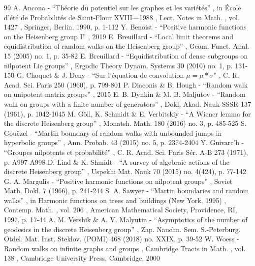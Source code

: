 \documentclass[11pt]{article}
\providecommand{\backmatter}{}
\numberwithin{equation}{section}
\theoremstyle{definition}
\begin{document}
\backmatter


\begin{thebibliography}{99}
 A. Ancona - “Théorie du potentiel sur les graphes et les variétés” , in École d’été de Probabilités de Saint-Flour XVIII—1988 , Lect. Notes in Math. , vol. 1427 , Springer, Berlin, 1990, p. 1-112
 Y. Benoist - “Positive harmonic functions on the Heisenberg group I” , 2019
 E. Breuillard - “Local limit theorems and equidistribution of random walks on the Heisenberg group” , Geom. Funct. Anal. 15 (2005) no. 1, p. 35-82
 E. Breuillard - “Equidistribution of dense subgroups on nilpotent Lie groups” , Ergodic Theory Dynam. Systems 30 (2010) no. 1, p. 131-150
 G. Choquet \& J. Deny - “Sur l’équation de convolution $\mu =\mu \ast \sigma $” , C. R. Acad. Sci. Paris 250 (1960), p. 799-801
 P. Diaconis \& B. Hough - “Random walk on unipotent matrix groups” , 2015
 E. B. Dynkin \& M. B. Maljutov - “Random walk on groups with a finite number of generators” , Dokl. Akad. Nauk SSSR 137 (1961), p. 1042-1045
 M. Göll, K. Schmidt \& E. Verbitskiy - “A Wiener lemma for the discrete Heisenberg group” , Monatsh. Math. 180 (2016) no. 3, p. 485-525
 S. Gouëzel - “Martin boundary of random walks with unbounded jumps in hyperbolic groups” , Ann. Probab. 43 (2015) no. 5, p. 2374-2404
 Y. Guivarc’h - “Groupes nilpotents et probabilité” , C. R. Acad. Sci. Paris Sér. A-B 273 (1971), p. A997-A998
 D. Lind \& K. Shmidt - “A survey of algebraic actions of the discrete Heisenberg group” , Uspekhi Mat. Nauk 70 (2015) no. 4(424), p. 77-142
 G. A. Margulis - “Positive harmonic functions on nilpotent groups” , Soviet Math. Dokl. 7 (1966), p. 241-244
 S. A. Sawyer - “Martin boundaries and random walks” , in Harmonic functions on trees and buildings (New York, 1995) , Contemp. Math. , vol. 206 , American Mathematical Society, Providence, RI, 1997, p. 17-44
 A. M. Vershik \& A. V. Malyutin - “Asymptotics of the number of geodesics in the discrete Heisenberg group” , Zap. Nauchn. Sem. S.-Peterburg. Otdel. Mat. Inst. Steklov. (POMI) 468 (2018) no. XXIX, p. 39-52
 W. Woess - Random walks on infinite graphs and groups , Cambridge Tracts in Math. , vol. 138 , Cambridge University Press, Cambridge, 2000
\end{thebibliography}
\end{document}
